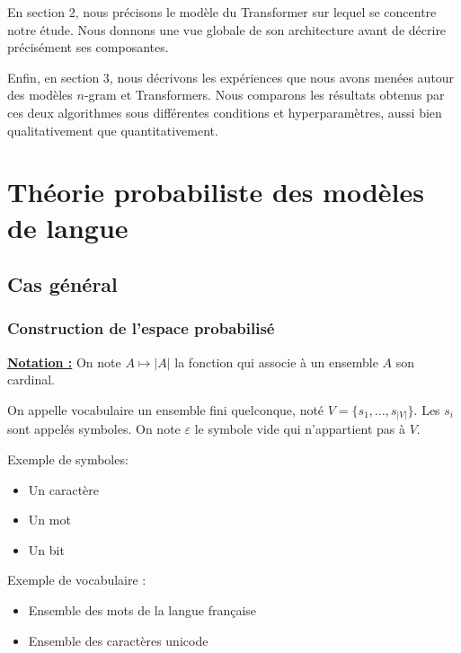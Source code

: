 En section 2, nous précisons le modèle du Transformer sur lequel se concentre notre étude. Nous donnons une vue globale de son architecture avant de décrire précisément ses composantes.

Enfin, en section 3, nous décrivons les expériences que nous avons menées autour des modèles $n$-gram et Transformers. Nous comparons les résultats obtenus par ces deux algorithmes sous différentes conditions et hyperparamètres, aussi bien qualitativement que quantitativement.

\section{Théorie probabiliste des modèles de langue}

\subsection{Cas général}

\subsubsection{Construction de l'espace probabilisé}

\noindent{}\underline{\textbf{Notation :}} On note $A \mapsto \vert A \vert$ la fonction qui associe à un ensemble $A$ son cardinal.

\begin{definition}
  On appelle vocabulaire un ensemble fini quelconque, noté $V = \{ s_1, \ldots, s_{\vert V \vert} \}$. Les $s_i$ sont appelés symboles.
  On note $\varepsilon$ le symbole vide qui n'appartient pas à $V$.
\end{definition}

\begin{minipage}[t]{0.4\textwidth}
 Exemple de symboles:
  \begin{itemize}
    \item Un caractère
    \item Un mot
    \item Un bit
  \end{itemize}
\end{minipage}
\hspace{\fill}
\begin{minipage}[t]{0.55\textwidth}
   Exemple de vocabulaire :
  \begin{itemize}
    \item Ensemble des mots de la langue française
    \item Ensemble des caractères unicode
  \end{itemize}
\end{minipage}

